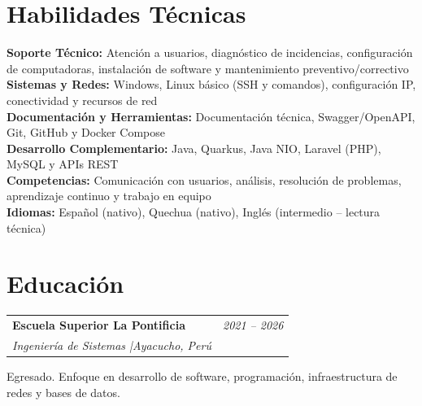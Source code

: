\documentclass[10pt, letterpaper]{article}
\newcommand{\cvskill}[2]{%
  \noindent\textbf{\color{primary}#1:} #2\\[1pt]
}
\begin{document}
\section{Habilidades Técnicas}
\cvskill{Soporte Técnico}{Atención a usuarios, diagnóstico de incidencias, configuración de computadoras, instalación de software y mantenimiento preventivo/correctivo}
\cvskill{Sistemas y Redes}{Windows, Linux básico (SSH y comandos), configuración IP, conectividad y recursos de red}
\cvskill{Documentación y Herramientas}{Documentación técnica, Swagger/OpenAPI, Git, GitHub y Docker Compose}
\cvskill{Desarrollo Complementario}{Java, Quarkus, Java NIO, Laravel (PHP), MySQL y APIs REST}
\cvskill{Competencias}{Comunicación con usuarios, análisis, resolución de problemas, aprendizaje continuo y trabajo en equipo}
\cvskill{Idiomas}{Español (nativo), Quechua (nativo), Inglés (intermedio -- lectura técnica)}
\section{Educación}
\noindent
\begin{tabularx}{\linewidth}{@{}Xr@{}}
  \textbf{Escuela Superior La Pontificia} & \textit{2021 -- 2026}\\
  \textit{Ingeniería de Sistemas \quad|\quad Ayacucho, Perú} & \\
\end{tabularx}
\vspace{2pt}
\noindent Egresado. Enfoque en desarrollo de software, programación, infraestructura de redes y bases de datos.
\end{document}
